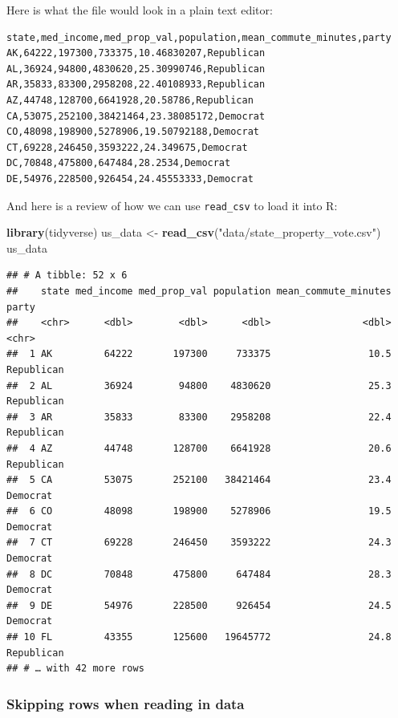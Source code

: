 \documentclass[
]{article}
\newenvironment{Shaded}{\begin{snugshade}}{\end{snugshade}}
\newcommand{\KeywordTok}[1]{\textcolor[rgb]{0.13,0.29,0.53}{\textbf{#1}}}
\newcommand{\NormalTok}[1]{#1}
\newcommand{\StringTok}[1]{\textcolor[rgb]{0.31,0.60,0.02}{#1}}
\begin{document}
Here is what the file would look in a plain text editor:

\begin{verbatim}
state,med_income,med_prop_val,population,mean_commute_minutes,party
AK,64222,197300,733375,10.46830207,Republican
AL,36924,94800,4830620,25.30990746,Republican
AR,35833,83300,2958208,22.40108933,Republican
AZ,44748,128700,6641928,20.58786,Republican
CA,53075,252100,38421464,23.38085172,Democrat
CO,48098,198900,5278906,19.50792188,Democrat
CT,69228,246450,3593222,24.349675,Democrat
DC,70848,475800,647484,28.2534,Democrat
DE,54976,228500,926454,24.45553333,Democrat
\end{verbatim}

And here is a review of how we can use \texttt{read\_csv} to load it
into R:

\begin{Shaded}
\begin{Highlighting}[]
\KeywordTok{library}\NormalTok{(tidyverse)}
\NormalTok{us\_data <{-}}\StringTok{ }\KeywordTok{read\_csv}\NormalTok{(}\StringTok{"data/state\_property\_vote.csv"}\NormalTok{)}
\NormalTok{us\_data}
\end{Highlighting}
\end{Shaded}

\begin{verbatim}
## # A tibble: 52 x 6
##    state med_income med_prop_val population mean_commute_minutes party     
##    <chr>      <dbl>        <dbl>      <dbl>                <dbl> <chr>     
##  1 AK         64222       197300     733375                 10.5 Republican
##  2 AL         36924        94800    4830620                 25.3 Republican
##  3 AR         35833        83300    2958208                 22.4 Republican
##  4 AZ         44748       128700    6641928                 20.6 Republican
##  5 CA         53075       252100   38421464                 23.4 Democrat  
##  6 CO         48098       198900    5278906                 19.5 Democrat  
##  7 CT         69228       246450    3593222                 24.3 Democrat  
##  8 DC         70848       475800     647484                 28.3 Democrat  
##  9 DE         54976       228500     926454                 24.5 Democrat  
## 10 FL         43355       125600   19645772                 24.8 Republican
## # … with 42 more rows
\end{verbatim}

\hypertarget{skipping-rows-when-reading-in-data}{%
\subsubsection{Skipping rows when reading in
data}\label{skipping-rows-when-reading-in-data}}
\end{document}
